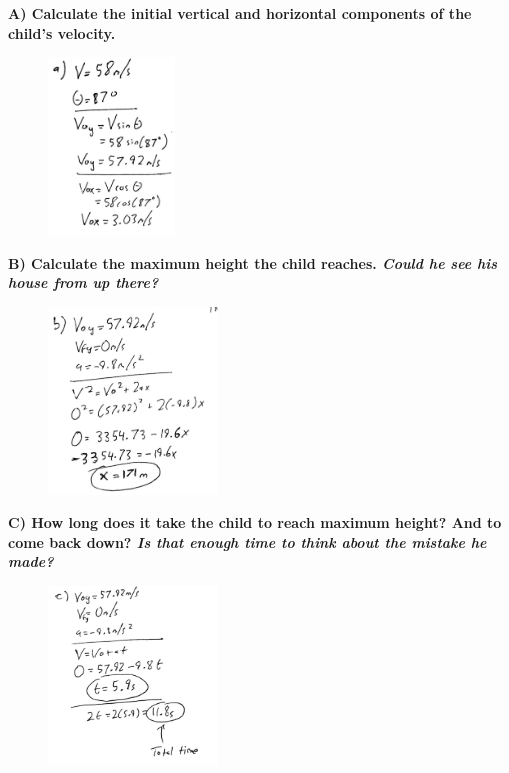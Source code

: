 \documentclass[a4paper,12pt]{article}
\begin{document}
\noindent\textbf{A) Calculate the initial vertical and horizontal components of the child's velocity.} \\


\begin{figure}[H]
    \centering
    \includegraphics[width=0.3\textwidth]{U2_P1_A} %
\end{figure}

\newpage

\noindent\textbf{B) Calculate the maximum height the child reaches. \emph{Could he see his house from up there?}} \\

\vspace{-0.5cm}

\begin{figure}[H]
    \centering
    \includegraphics[width=0.4\textwidth]{U2_P1_B} %
\end{figure}

\noindent\textbf{C) How long does it take the child to reach maximum height? And to come back down? \emph{Is that enough time to think about the mistake he made?}} \\

\vspace{-0.5cm}

\begin{figure}[H]
    \centering
    \includegraphics[width=0.4\textwidth]{U2_P1_C} %
\end{figure}
\end{document}
